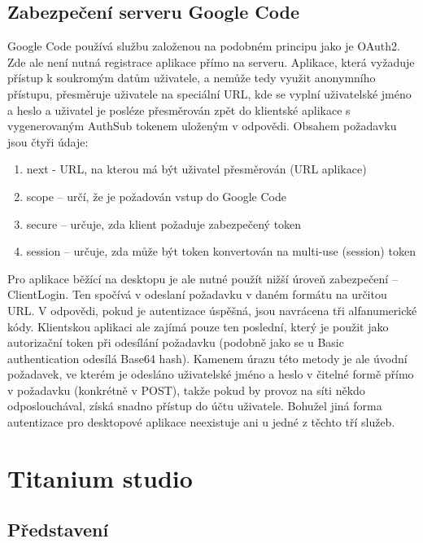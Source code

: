 \subsection{Zabezpečení serveru Google Code}

Google Code používá službu\cite{googleauth} založenou na podobném principu jako je OAuth2. Zde ale není nutná registrace aplikace přímo na serveru. Aplikace, která vyžaduje přístup k soukromým datům uživatele, a nemůže tedy využit anonymního přístupu, přesměruje uživatele na speciální URL, kde se vyplní uživatelské jméno a heslo a uživatel je posléze přesměrován zpět do klientské aplikace s vygenerovaným AuthSub tokenem uloženým v odpovědi. Obsahem požadavku jsou čtyři údaje:

\begin{enumerate}
\item next - URL, na kterou má být uživatel přesměrován (URL aplikace)
\item scope – určí, že je požadován vstup do Google Code
\item secure – určuje, zda klient požaduje zabezpečený token
\item session – určuje, zda může být token konvertován na multi-use (session) token
\end{enumerate}

Pro aplikace běžící na desktopu je ale nutné použít nižší úroveň zabezpečení – ClientLogin. Ten spočívá v odeslaní požadavku v daném formátu na určitou URL. V odpovědi, pokud je autentizace úspěšná, jsou navrácena tři alfanumerické kódy. Klientskou aplikaci ale zajímá pouze ten poslední, který je použit jako autorizační token při odesílání požadavku (podobně jako se u Basic authentication odesílá Base64 hash). Kamenem úrazu této metody je ale úvodní požadavek, ve kterém je odesláno uživatelské jméno a heslo v čitelné formě přímo v požadavku (konkrétně v POST), takže pokud by provoz na síti někdo odposlouchával, získá snadno přístup do účtu uživatele. Bohužel jiná forma autentizace pro desktopové aplikace neexistuje ani u jedné z těchto tří služeb.

\section{Titanium studio}

\subsection{Představení}

